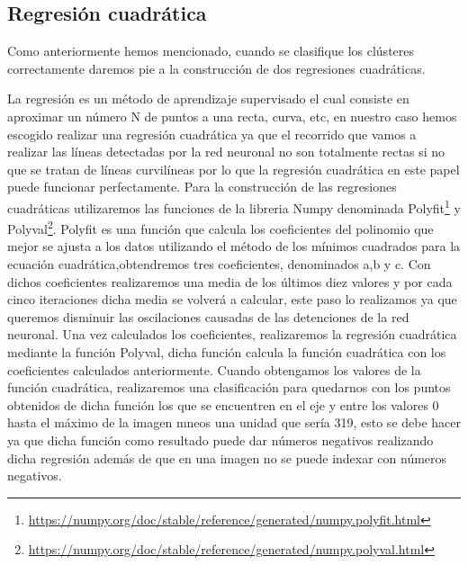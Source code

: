 \subsection{Regresión cuadrática}
\label{sec:Regresión cuadrática}
Como anteriormente hemos mencionado, cuando se clasifique los clústeres correctamente daremos pie a la construcción de dos regresiones cuadráticas. \newline 

La regresión es un método de aprendizaje supervisado el cual consiste en aproximar un número N de puntos a una recta, curva, etc, en nuestro caso hemos escogido realizar una regresión cuadrática ya que el recorrido
que vamos a realizar las líneas detectadas por la red neuronal no son totalmente rectas si no que se tratan de líneas curvilíneas por lo que la regresión cuadrática en este papel puede 
funcionar perfectamente. 
Para la construcción de las regresiones cuadráticas utilizaremos las funciones de la libreria Numpy denominada Polyfit\footnote{\url{https://numpy.org/doc/stable/reference/generated/numpy.polyfit.html}}
y Polyval\footnote{\url{ https://numpy.org/doc/stable/reference/generated/numpy.polyval.html}}. 
Polyfit es una función que calcula los  coeficientes del polinomio que mejor se ajusta a los datos utilizando el método de los mínimos 
cuadrados para la ecuación cuadrática,obtendremos tres coeficientes, denominados a,b y c. \newline
\newline
Con dichos coeficientes realizaremos una media de los últimos diez valores y por cada cinco iteraciones dicha media se volverá a calcular, este paso lo realizamos ya que 
queremos disminuir las oscilaciones causadas de las detenciones de la red neuronal. Una vez calculados los coeficientes, realizaremos la regresión cuadrática mediante la función Polyval, dicha función calcula
la función cuadrática con los coeficientes calculados anteriormente. \newline 
Cuando obtengamos los valores de la función cuadrática, realizaremos una clasificación para quedarnos con los puntos obtenidos
de dicha función los que se encuentren en el eje y entre los valores 0 hasta el máximo de la imagen mneos una unidad que sería 319, esto se debe hacer ya que dicha función como resultado puede 
dar números negativos realizando dicha regresión además de que en una imagen no se puede indexar con números negativos. \newline



